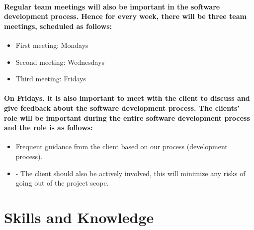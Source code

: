 \documentclass{article}
\begin{document}
\paragraph{Regular team meetings will also be important in the software development process. Hence for every week, there will be three team meetings, scheduled as follows:}

\begin{itemize}
\item First meeting: Mondays
\item Second meeting: Wednesdays
\item Third meeting: Fridays
\end{itemize}

\paragraph{On Fridays, it is also important to meet with the client to discuss and give feedback about the software development process. The clients’ role will be important during the entire software development process and the role is as follows:}

\begin{itemize}
\item Frequent guidance from the client based on our process (development process).
\item -	The client should also be actively involved, this will minimize any risks of going out of the project scope.
\end{itemize}

\section{Skills and Knowledge}
\end{document}
